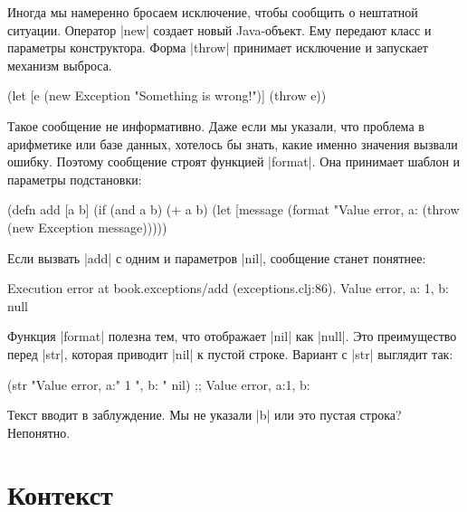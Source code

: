 Иногда мы намеренно бросаем исключение, чтобы сообщить о нештатной
ситуации. Оператор \spverb|new| создает новый Java-объект. Ему передают класс и
параметры конструктора. Форма \spverb|throw| принимает исключение и запускает
механизм выброса.

\begin{english}
  \begin{clojure}
(let [e (new Exception "Something is wrong!")]
  (throw e))
  \end{clojure}
\end{english}

Такое сообщение не информативно. Даже если мы указали, что проблема в арифметике
или базе данных, хотелось бы знать, какие именно значения вызвали
ошибку. Поэтому сообщение строят функцией \spverb|format|. Она принимает шаблон
и параметры подстановки:

\begin{english}
  \begin{clojure}
(defn add [a b]
  (if (and a b)
    (+ a b)
    (let [message (format "Value error, a: %
      (throw (new Exception message)))))
  \end{clojure}
\end{english}

\noindent
Если вызвать \spverb|add| с одним и параметров \spverb|nil|, сообщение станет
понятнее:

\begin{english}
  \begin{clojure}
Execution error at book.exceptions/add (exceptions.clj:86).
Value error, a: 1, b: null
  \end{clojure}
\end{english}

Функция \spverb|format| полезна тем, что отображает \spverb|nil| как
\spverb|null|. Это преимущество перед \spverb|str|, которая приводит
\spverb|nil| к пустой строке. Вариант с \spverb|str| выглядит так:

\begin{english}
  \begin{clojure}
(str "Value error, a:" 1 ", b: " nil)
;; Value error, a:1, b:
  \end{clojure}
\end{english}

\noindent
Текст вводит в заблуждение. Мы не указали \spverb|b| или это пустая строка?
Непонятно.

\section{Контекст}

